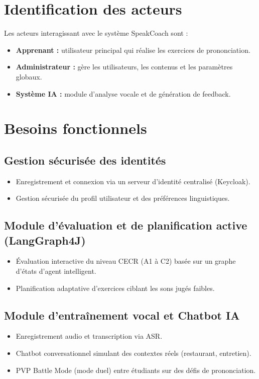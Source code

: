 \documentclass[12pt,a4paper]{report}
\begin{document}
\section{Identification des acteurs}

Les acteurs interagissant avec le système SpeakCoach sont :

\begin{itemize}[leftmargin=2cm]
    \item \textbf{Apprenant :} utilisateur principal qui réalise les exercices de prononciation.
    \item \textbf{Administrateur :} gère les utilisateurs, les contenus et les paramètres globaux.
    \item \textbf{Système IA :} module d'analyse vocale et de génération de feedback.
\end{itemize}

\section{Besoins fonctionnels}

\subsection{Gestion sécurisée des identités}
\begin{itemize}[leftmargin=2cm]
    \item Enregistrement et connexion via un serveur d'identité centralisé (Keycloak).
    \item Gestion sécurisée du profil utilisateur et des préférences linguistiques.
\end{itemize}

\subsection{Module d'évaluation et de planification active (LangGraph4J)}
\begin{itemize}[leftmargin=2cm]
    \item Évaluation interactive du niveau CECR (A1 à C2) basée sur un graphe d'états d'agent intelligent.
    \item Planification adaptative d'exercices ciblant les sons jugés faibles.
\end{itemize}

\subsection{Module d'entraînement vocal et Chatbot IA}
\begin{itemize}[leftmargin=2cm]
    \item Enregistrement audio et transcription via ASR.
    \item Chatbot conversationnel simulant des contextes réels (restaurant, entretien).
    \item PVP Battle Mode (mode duel) entre étudiants sur des défis de prononciation.
\end{itemize}
\end{document}
